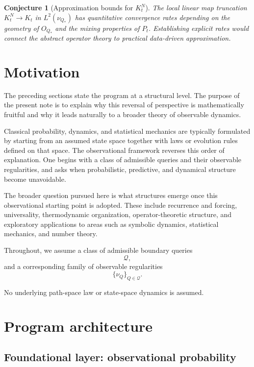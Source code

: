 \documentclass[11pt]{article}
\newtheorem{conjecture}{Conjecture}
\begin{document}
\begin{conjecture}[Approximation bounds for $K_t^N$]
The local linear map truncation $K_t^N \to K_t$ in $L^2(\nu_{Q_*})$
has quantitative convergence rates depending on the geometry of
$O_{Q_*}$ and the mixing properties of $P_t$.  Establishing explicit
rates would connect the abstract operator theory to practical
data-driven approximation.
\end{conjecture}


\section{Motivation}

The preceding sections state the program at a structural level.  The
purpose of the present note is to explain why this reversal of
perspective is mathematically fruitful and why it leads naturally to a
broader theory of observable dynamics.

Classical probability, dynamics, and statistical mechanics are typically
formulated by starting from an assumed state space together with laws or
evolution rules defined on that space.  The observational framework
reverses this order of explanation.  One begins with a class of admissible
queries and their observable regularities, and asks when probabilistic,
predictive, and dynamical structure become unavoidable.

The broader question pursued here is what structures emerge once this
observational starting point is adopted.  These include recurrence and
forcing, universality, thermodynamic organization, operator-theoretic
structure, and exploratory applications to areas such as symbolic
dynamics, statistical mechanics, and number theory.

Throughout, we assume a class of admissible boundary queries
\[
\mathcal Q,
\]
and a corresponding family of observable regularities
\[
\{\nu_Q\}_{Q\in\mathcal Q}.
\]

No underlying path-space law or state-space dynamics is assumed.

\section{Program architecture}

\subsection{Foundational layer: observational probability}
\end{document}

